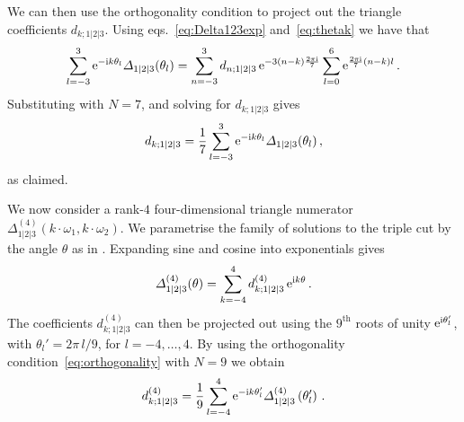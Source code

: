 We can then use the orthogonality condition to project out the triangle coefficients $d_{k;1|2|3}$. Using eqs.~\eqref{eq:Delta123exp} and~\eqref{eq:thetak} we have that
\begin{align}
\sum_{l=-3}^3 \text{e}^{-\i k \theta_l} \Delta_{1|2|3}(\theta_l) = \sum_{n=-3}^3 d_{n;1|2|3} \, \text{e}^{- 3 (n-k) \frac{2\pi\i}{7}} \sum_{l=0}^6 \text{e}^{\frac{2\pi \i}{7} (n-k) l} \,.
\end{align}
Substituting  with $N=7$, and solving for $d_{k;1|2|3}$ gives
\begin{align}
d_{k;1|2|3} = \frac{1}{7} \sum_{l=-3}^3 \text{e}^{-\i k \theta_l} \Delta_{1|2|3}(\theta_l)\,,
\end{align}
as claimed.

\smallskip

We now consider a rank-$4$ four-dimensional triangle numerator $\Delta_{1|2|3}^{(4)}(k\cdot \omega_1, k\cdot \omega_2)$. 
We parametrise the family of solutions to the triple cut by the angle $\theta$ as in .
Expanding sine and cosine into exponentials gives
\begin{align}
\Delta_{1|2|3}^{(4)}(\theta) = \sum_{k=-4}^4 d_{k;1|2|3}^{(4)} \, \text{e}^{\i k \theta} \,.
\end{align}
The coefficients $d_{k;1|2|3}^{(4)}$ can then be projected out using the $9^{\text{th}}$ roots of unity $\text{e}^{\mathrm{i} \theta_l'}$, with $\theta_l' = 2\pi \, l/9$, for $l=-4,\ldots,4$. By using the orthogonality condition~\eqref{eq:orthogonality} with $N=9$ we obtain
 \begin{align}
d_{k;1|2|3}^{(4)} = \frac{1}{9} \sum_{l=-4}^4 \text{e}^{-\i k \theta_l'} \Delta_{1|2|3}^{(4)}\left(\theta_l'\right)\,.
\end{align}


